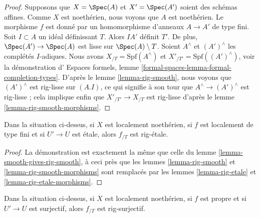 \begin{proof}
\medskip\noindent
Supposons que $X = \Spec(A)$ et $X' = \Spec(A')$ soient des schémas affines.
Comme $X$ est noethérien, nous voyons que $A$ est noethérien.
Le morphisme $f$ est donné par un homomorphisme d'anneaux
$A \to A'$ de type fini. Soit $I \subset A$ un idéal définissant $T$.
Alors $IA'$ définit $T'$. De plus, $\Spec(A') \to \Spec(A)$ est lisse sur
$\Spec(A) \setminus T$. Soient $A^\wedge$ et $(A')^\wedge$ les complétés
$I$-adiques. Nous avons $X_{/T} = \text{Spf}(A^\wedge)$ et
$X'_{/T'} = \text{Spf}((A')^\wedge)$, voir la démonstration d'
Espaces formels, lemme
\ref{formal-spaces-lemma-formal-completion-types}.
D'après le lemme \ref{lemma-rig-smooth}, nous voyons que
$(A')^\wedge$ est rig-lisse sur $(A. I)$,
ce qui signifie à son tour que $A^\wedge \to (A')^\wedge$ est rig-lisse ;
cela implique enfin que $X'_{/T'} \to X_{/T}$ est rig-lisse d'après le
lemme \ref{lemma-rig-smooth-morphisms}.
\end{proof}

\begin{lemma}
\label{lemma-etale-gives-rig-etale}
Dans la situation ci-dessus, si $X$ est localement noethérien,
si $f$ est localement de type fini et si $U' \to U$ est étale, alors
$f_{/T}$ est rig-étale.
\end{lemma}

\begin{proof}
La démonstration est exactement la même que celle du
lemme \ref{lemma-smooth-gives-rig-smooth}, à ceci près que les
lemmes \ref{lemma-rig-smooth} et \ref{lemma-rig-smooth-morphisms}
sont remplacés par les
lemmes \ref{lemma-rig-etale} et \ref{lemma-rig-etale-morphisms}.
\end{proof}

\begin{lemma}
\label{lemma-completion-proper-surjective-rig-surjective}
Dans la situation ci-dessus, si $X$ est localement noethérien,
si $f$ est propre et si $U' \to U$ est surjectif, alors $f_{/T}$ est rig-surjectif.
\end{lemma}

